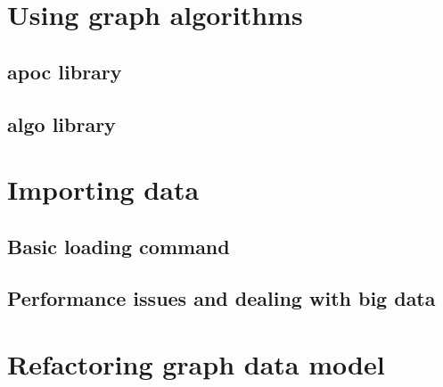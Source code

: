 \documentclass[12pt]{beamer}
\begin{document}
    \section{Using graph algorithms}
    \subsection{apoc library}
    \subsection{algo library}
    
    \section{Importing data}
    \subsection{Basic loading command}
    \subsection{Performance issues and dealing with big data}
    
    
    \section{Refactoring graph data model}
    
\end{document}
